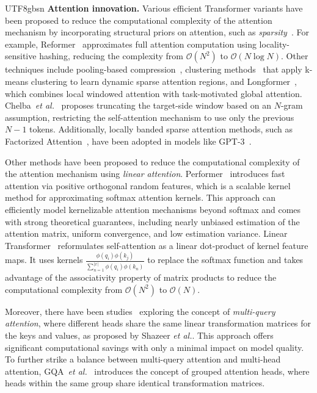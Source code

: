 \documentclass[10pt,journal,compsoc]{IEEEtran}
\newcommand{\etal}{\emph{et al.}}
\newcommand{\<}{\left\langle}
\renewcommand{\>}{\right\rangle}
\newcommand{\1}{\mathbbm{1}}
\begin{document}
\begin{CJK}{UTF8}{gbsn}
\noindent\textbf{Attention innovation.} 
Various efficient Transformer variants have been proposed to reduce the computational complexity of the attention mechanism by incorporating structural priors on attention, such as \emph{sparsity}~\cite{peng2021random,zaheer2020big,child2019generating,roy2021efficient,rae2019compressive,xiao2023efficient}. For example, Reformer~\cite{kitaev2020reformer} approximates full attention computation using locality-sensitive hashing, reducing the complexity from $\mathcal{O}(N^2)$ to $\mathcal{O}(N\log N)$. Other techniques include pooling-based compression~\cite{rae2019compressive}, clustering methods~\cite{roy2021efficient,khandelwal2019generalization} that apply k-means clustering to learn dynamic sparse attention regions, and Longformer~\cite{beltagy2020longformer}, which combines local windowed attention with task-motivated global attention.
Chelba~\etal~\cite{chelba2020faster} proposes truncating the target-side window based on an $N$-gram assumption, restricting the self-attention mechanism to use only the previous $N-1$ tokens. Additionally, locally banded sparse attention methods, such as Factorized Attention~\cite{child2019generating}, have been adopted in models like GPT-3~\cite{brown2020language}.

Other methods have been proposed to reduce the computational complexity of the attention mechanism using \emph{linear attention}.
Performer~\cite{choromanski2020rethinking} introduces fast attention via positive orthogonal random features, which is a scalable kernel method for approximating softmax attention kernels. This approach can efficiently model kernelizable attention mechanisms beyond softmax and comes with strong theoretical guarantees, including nearly unbiased estimation of the attention matrix, uniform convergence, and low estimation variance.
Linear Transformer~\cite{katharopoulos2020Transformers} reformulates self-attention as a linear dot-product of kernel feature maps. It uses kernels $\frac{\phi(q_i)\phi(k_j)}{\sum_{n=1}^{|x|}\phi(q_i)\phi(k_n)}$ to replace the softmax function and takes advantage of the associativity property of matrix products to reduce the computational complexity from $\mathcal{O}(N^2)$ to $\mathcal{O}(N)$.

Moreover, there have been studies~\cite{chowdhery2022palm,li2023starcoder,shazeer2019fast} exploring the concept of \emph{multi-query attention}, where different heads share the same linear transformation matrices for the keys and values, as proposed by Shazeer \etal\cite{shazeer2019fast}. This approach offers significant computational savings with only a minimal impact on model quality. To further strike a balance between multi-query attention and multi-head attention, GQA~\etal~\cite{ainslie2023gqa} introduces the concept of grouped attention heads, where heads within the same group share identical transformation matrices.


\end{CJK}
\end{document}
